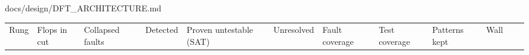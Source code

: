 \begin{relocated}{docs/design/DFT_ARCHITECTURE.md}
\begin{landscape}
{
\begin{longtable}[]{@{}
  >{\raggedright\arraybackslash}p{}
  >{\raggedright\arraybackslash}p{}
  >{\raggedright\arraybackslash}p{}
  >{\raggedright\arraybackslash}p{}
  >{\raggedright\arraybackslash}p{}
  >{\raggedright\arraybackslash}p{}
  >{\raggedright\arraybackslash}p{}
  >{\raggedright\arraybackslash}p{}
  >{\raggedright\arraybackslash}p{}
  >{\raggedright\arraybackslash}p{}
  >{\raggedright\arraybackslash}p{}
  >{\raggedright\arraybackslash}p{}@{}}
\toprule\noalign{}
\begin{minipage}[b]{\linewidth}\raggedright
Rung
\end{minipage} & \begin{minipage}[b]{\linewidth}\raggedright
Flops in cut
\end{minipage} & \begin{minipage}[b]{\linewidth}\raggedright
Collapsed faults
\end{minipage} & \begin{minipage}[b]{\linewidth}\raggedright
Detected
\end{minipage} & \begin{minipage}[b]{\linewidth}\raggedright
Proven untestable (SAT)
\end{minipage} & \begin{minipage}[b]{\linewidth}\raggedright
Unresolved
\end{minipage} & \begin{minipage}[b]{\linewidth}\raggedright
Fault coverage
\end{minipage} & \begin{minipage}[b]{\linewidth}\raggedright
Test coverage
\end{minipage} & \begin{minipage}[b]{\linewidth}\raggedright
Patterns kept
\end{minipage} & \begin{minipage}[b]{\linewidth}\raggedright
Wall
\end{minipage} & \begin{minipage}[b]{\linewidth}\raggedright

\end{minipage}
\end{longtable}}
\end{landscape}
\end{relocated}

